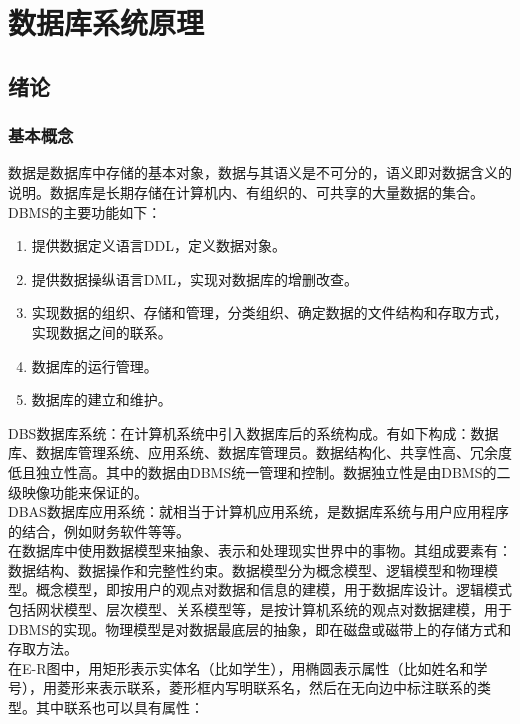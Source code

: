 \documentclass[chapter.computer_science.tex]{subfiles}
\begin{document}
\section{数据库系统原理}
\subsection{绪论}
\subsubsection{基本概念}
数据是数据库中存储的基本对象，数据与其语义是不可分的，语义即对数据含义的说明。数据库是长期存储在计算机内、有组织的、可共享的大量数据的集合。
DBMS的主要功能如下：\\
\begin{enumerate}
    \item 提供数据定义语言DDL，定义数据对象。
    \item 提供数据操纵语言DML，实现对数据库的增删改查。
    \item 实现数据的组织、存储和管理，分类组织、确定数据的文件结构和存取方式，实现数据之间的联系。
    \item 数据库的运行管理。
    \item 数据库的建立和维护。
\end{enumerate}
DBS数据库系统：在计算机系统中引入数据库后的系统构成。有如下构成：数据库、数据库管理系统、应用系统、数据库管理员。数据结构化、共享性高、冗余度低且独立性高。其中的数据由DBMS统一管理和控制。数据独立性是由DBMS的二级映像功能来保证的。\\
DBAS数据库应用系统：就相当于计算机应用系统，是数据库系统与用户应用程序的结合，例如财务软件等等。\\
在数据库中使用数据模型来抽象、表示和处理现实世界中的事物。其组成要素有：数据结构、数据操作和完整性约束。数据模型分为概念模型、逻辑模型和物理模型。概念模型，即按用户的观点对数据和信息的建模，用于数据库设计。逻辑模式包括网状模型、层次模型、关系模型等，是按计算机系统的观点对数据建模，用于DBMS的实现。物理模型是对数据最底层的抽象，即在磁盘或磁带上的存储方式和存取方法。\\
在E-R图中，用矩形表示实体名（比如学生），用椭圆表示属性（比如姓名和学号），用菱形来表示联系，菱形框内写明联系名，然后在无向边中标注联系的类型。其中联系也可以具有属性：
\end{document}
